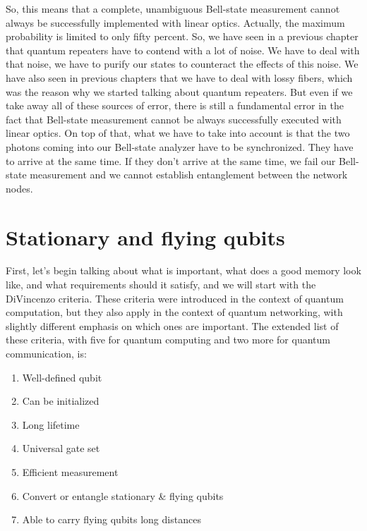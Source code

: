 So, this means that a complete, unambiguous Bell-state measurement cannot always be successfully implemented with linear optics. Actually, the maximum probability is limited to only fifty percent. So, we have seen in a previous chapter that quantum repeaters have to contend with a lot of noise. We have to deal with that noise, we have to purify our states to counteract the effects of this noise. We have also seen in previous chapters that we have to deal with lossy fibers, which was the reason why we started talking about quantum repeaters. But even if we take away all of these sources of error, there is still a fundamental error in the fact that Bell-state measurement cannot be always successfully executed with linear optics. On top of that, what we have to take into account is that the two photons coming into our Bell-state analyzer have to be synchronized. They have to arrive at the same time. If they don't arrive at the same time, we fail our Bell-state measurement and we cannot establish entanglement between the network nodes.



\section{Stationary and flying qubits}

First, let's begin talking about what is important, what does a good memory look like, and what requirements should it satisfy, and we will start with the DiVincenzo criteria. These criteria were introduced in the context of quantum computation, but they also apply in the context of quantum networking, with slightly different emphasis on which ones are important.  The extended list of these criteria, with five for quantum computing and two more for quantum communication, is:

\begin{enumerate}
    \item Well-defined qubit
    \item Can be initialized
    \item Long lifetime
    \item Universal gate set
    \item Efficient measurement
    \item Convert or entangle stationary \& flying qubits
    \item Able to carry flying qubits long distances
\end{enumerate}


